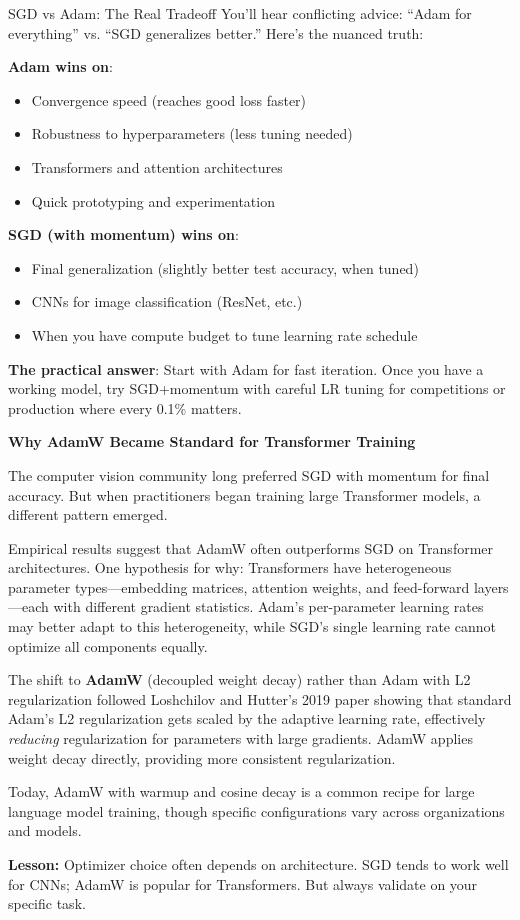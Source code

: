 \documentclass[../../main.tex]{subfiles}
\begin{document}
\begin{keyconcept}{SGD vs Adam: The Real Tradeoff}
You'll hear conflicting advice: ``Adam for everything'' vs. ``SGD generalizes better.'' Here's the nuanced truth:

\textbf{Adam wins on}:
\begin{itemize}
    \item Convergence speed (reaches good loss faster)
    \item Robustness to hyperparameters (less tuning needed)
    \item Transformers and attention architectures
    \item Quick prototyping and experimentation
\end{itemize}

\textbf{SGD (with momentum) wins on}:
\begin{itemize}
    \item Final generalization (slightly better test accuracy, when tuned)
    \item CNNs for image classification (ResNet, etc.)
    \item When you have compute budget to tune learning rate schedule
\end{itemize}

\textbf{The practical answer}: Start with Adam for fast iteration. Once you have a working model, try SGD+momentum with careful LR tuning for competitions or production where every 0.1\% matters.
\end{keyconcept}

\begin{warstory}
\textbf{Why AdamW Became Standard for Transformer Training}

The computer vision community long preferred SGD with momentum for final accuracy. But when practitioners began training large Transformer models, a different pattern emerged.

Empirical results suggest that AdamW often outperforms SGD on Transformer architectures. One hypothesis for why: Transformers have heterogeneous parameter types---embedding matrices, attention weights, and feed-forward layers---each with different gradient statistics. Adam's per-parameter learning rates may better adapt to this heterogeneity, while SGD's single learning rate cannot optimize all components equally.

The shift to \textbf{AdamW} (decoupled weight decay) rather than Adam with L2 regularization followed Loshchilov and Hutter's 2019 paper showing that standard Adam's L2 regularization gets scaled by the adaptive learning rate, effectively \emph{reducing} regularization for parameters with large gradients. AdamW applies weight decay directly, providing more consistent regularization.

Today, AdamW with warmup and cosine decay is a common recipe for large language model training, though specific configurations vary across organizations and models.

\textbf{Lesson:} Optimizer choice often depends on architecture. SGD tends to work well for CNNs; AdamW is popular for Transformers. But always validate on your specific task.
\end{warstory}
\end{document}
